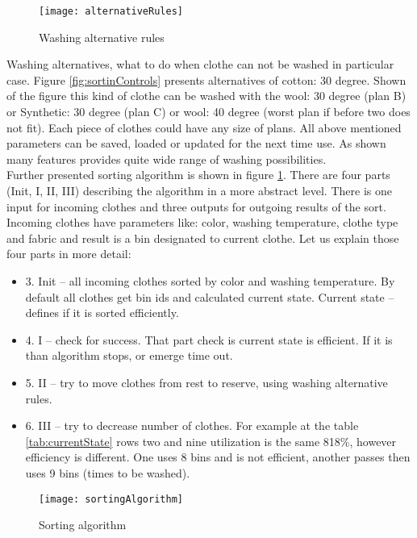 \begin{figure}[h]
	\centering
		\texttt{[image: alternativeRules]}
	\caption{Washing alternative rules}
	\label{fig:alternativeRules}
\end{figure}

Washing alternatives, what to do when clothe can not be washed in particular case. Figure \ref{fig:sortinControls} presents alternatives of cotton: 30 degree. Shown of the figure this kind of clothe can be washed with the wool: 30 degree (plan B) or Synthetic: 30 degree (plan C) or wool: 40 degree (worst plan if before two does not fit). Each piece of clothes could have any size of plans. All above mentioned parameters can be saved, loaded or updated for the next time use. As shown many features provides quite wide range of washing possibilities.
\\
Further presented sorting algorithm is shown in figure \ref{fig:alternativeRules}. There are four parts (Init, I, II, III) describing the algorithm in a more abstract level. There is one input for incoming clothes and three outputs for outgoing results of the sort. Incoming clothes have parameters like: color, washing temperature, clothe type and fabric and result is a bin designated to current clothe.  Let us explain those four parts in more detail:

\begin{itemize}
	\item 3. Init – all incoming clothes sorted by color and washing temperature. By default all clothes get bin ids and calculated current state. Current state – defines if it is sorted efficiently.
	\item 4. I – check for success. That part check is current state is efficient. If it is than algorithm stops, or emerge time out.
	\item 5. II – try to move clothes from rest to reserve, using washing alternative rules. 
	\item 6. III – try to decrease number of clothes. For example at the table \ref{tab:currentState} rows two and nine utilization is the same 818\%, however efficiency is different. One uses 8 bins and is not efficient, another passes then uses 9 bins (times to be washed).
\end{itemize}

\begin{figure}[h]
	\centering
		\texttt{[image: sortingAlgorithm]}
	\caption{Sorting algorithm}
	\label{fig:sortingAlgorithm}
\end{figure}

